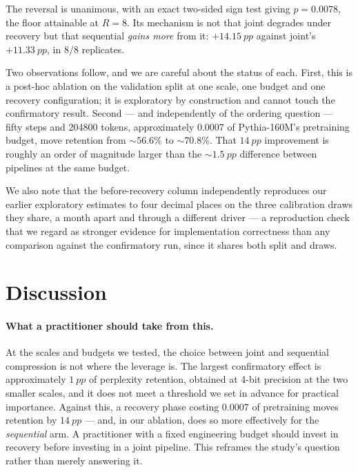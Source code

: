 The reversal is unanimous, with an exact two-sided sign test giving $p = 0.0078$, the floor
attainable at $R{=}8$. Its mechanism is not that joint degrades under recovery but that
sequential \emph{gains more} from it: $+\SI{14.15}{pp}$ against joint's $+\SI{11.33}{pp}$,
in $8/8$ replicates.

Two observations follow, and we are careful about the status of each. First, this is a
post-hoc ablation on the validation split at one scale, one budget and one recovery
configuration; it is exploratory by construction and cannot touch the confirmatory result.
Second --- and independently of the ordering question --- fifty steps and \num{204800}
tokens, approximately $0.0007$ of Pythia-160M's pretraining budget, move retention from
$\sim\!56.6\%$ to $\sim\!70.8\%$. That $\SI{14}{pp}$ improvement is roughly an order of
magnitude larger than the $\sim\!\SI{1.5}{pp}$ difference between pipelines at the same
budget.

We also note that the before-recovery column independently reproduces our earlier exploratory
estimates to four decimal places on the three calibration draws they share, a month apart and
through a different driver --- a reproduction check that we regard as stronger evidence for
implementation correctness than any comparison against the confirmatory run, since it shares
both split and draws.

\section{Discussion}
\label{sec:discussion}

\paragraph{What a practitioner should take from this.} At the scales and budgets we tested,
the choice between joint and sequential compression is not where the leverage is. The largest
confirmatory effect is approximately $\SI{1}{pp}$ of perplexity retention, obtained at 4-bit
precision at the two smaller scales, and it does not meet a threshold we set in advance for
practical importance. Against this, a recovery phase costing $0.0007$ of pretraining moves
retention by $\SI{14}{pp}$ --- and, in our ablation, does so more effectively for the
\emph{sequential} arm. A practitioner with a fixed engineering budget should invest in
recovery before investing in a joint pipeline. This reframes the study's question rather than
merely answering it.

